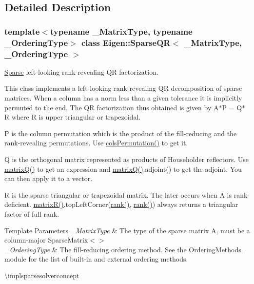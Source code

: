 \subsection{Detailed Description}
\subsubsection*{template$<$typename \+\_\+\+Matrix\+Type, typename \+\_\+\+Ordering\+Type$>$\newline
class Eigen\+::\+Sparse\+Q\+R$<$ \+\_\+\+Matrix\+Type, \+\_\+\+Ordering\+Type $>$}

\mbox{\hyperlink{struct_eigen_1_1_sparse}{Sparse}} left-\/looking rank-\/revealing QR factorization. 

This class implements a left-\/looking rank-\/revealing QR decomposition of sparse matrices. When a column has a norm less than a given tolerance it is implicitly permuted to the end. The QR factorization thus obtained is given by A$\ast$P = Q$\ast$R where R is upper triangular or trapezoidal.

P is the column permutation which is the product of the fill-\/reducing and the rank-\/revealing permutations. Use \mbox{\hyperlink{class_eigen_1_1_sparse_q_r_a140930ebbf89dfd57a173761716db38f}{cols\+Permutation()}} to get it.

Q is the orthogonal matrix represented as products of Householder reflectors. Use \mbox{\hyperlink{class_eigen_1_1_sparse_q_r_ae1cc0a836c177d4f42600f8639354be1}{matrix\+Q()}} to get an expression and \mbox{\hyperlink{class_eigen_1_1_sparse_q_r_ae1cc0a836c177d4f42600f8639354be1}{matrix\+Q()}}.adjoint() to get the adjoint. You can then apply it to a vector.

R is the sparse triangular or trapezoidal matrix. The later occurs when A is rank-\/deficient. \mbox{\hyperlink{class_eigen_1_1_sparse_q_r_a564524ff13b2b6dd1e76127404f7b920}{matrix\+R()}}.top\+Left\+Corner(\mbox{\hyperlink{class_eigen_1_1_sparse_q_r_a70ec2b9e5cb62a41dc1ee2adfb54e9b0}{rank()}}, \mbox{\hyperlink{class_eigen_1_1_sparse_q_r_a70ec2b9e5cb62a41dc1ee2adfb54e9b0}{rank()}}) always returns a triangular factor of full rank.


\begin{DoxyTemplParams}{Template Parameters}
{\em \+\_\+\+Matrix\+Type} & The type of the sparse matrix A, must be a column-\/major Sparse\+Matrix$<$$>$ \\
\hline
{\em \+\_\+\+Ordering\+Type} & The fill-\/reducing ordering method. See the \mbox{\hyperlink{}{Ordering\+Methods }} module for the list of built-\/in and external ordering methods.\\
\hline
\end{DoxyTemplParams}
\textbackslash{}implsparsesolverconcept

